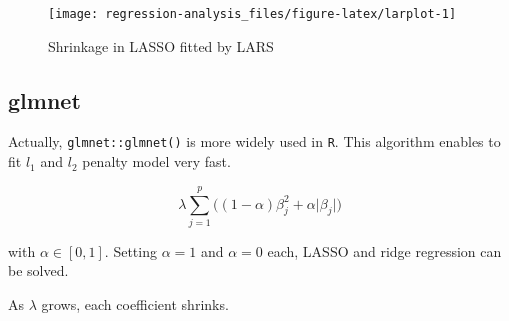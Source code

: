 \documentclass[]{book}
\newenvironment{Shaded}{\begin{snugshade}}{\end{snugshade}}
\newcommand{\DataTypeTok}[1]{\textcolor[rgb]{0.13,0.29,0.53}{#1}}
\newcommand{\DecValTok}[1]{\textcolor[rgb]{0.00,0.00,0.81}{#1}}
\newcommand{\KeywordTok}[1]{\textcolor[rgb]{0.13,0.29,0.53}{\textbf{#1}}}
\newcommand{\NormalTok}[1]{#1}
\newcommand{\OperatorTok}[1]{\textcolor[rgb]{0.81,0.36,0.00}{\textbf{#1}}}
\newcommand{\StringTok}[1]{\textcolor[rgb]{0.31,0.60,0.02}{#1}}
\theoremstyle{definition}
\theoremstyle{definition}
\theoremstyle{definition}
\theoremstyle{remark}
\begin{document}
\begin{figure}[H]

{\centering \texttt{[image: regression-analysis\_files/figure-latex/larplot-1]} 

}

\caption{Shrinkage in LASSO fitted by LARS}\label{fig:larplot}
\end{figure}

\hypertarget{glmnet}{%
\subsection{glmnet}\label{glmnet}}

Actually, \texttt{glmnet::glmnet()} is more widely used in \texttt{R}. This algorithm enables to fit \(l_1\) and \(l_2\) penalty model very fast.

\[\lambda \sum_{j = 1}^p \bigg( (1 - \alpha) \beta_j^2 + \alpha \lvert \beta_j \rvert \bigg)\]

with \(\alpha \in [0,1]\). Setting \(\alpha = 1\) and \(\alpha = 0\) each, LASSO and ridge regression can be solved.

\begin{Shaded}
\end{Shaded}

As \(\lambda\) grows, each coefficient shrinks.
\end{document}

